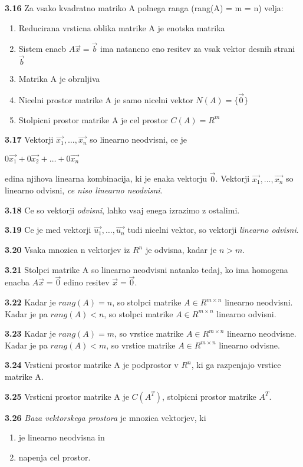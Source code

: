 \documentclass{article}
\begin{document}
\begin{multicols}{4}
\textbf{3.16} Za vsako kvadratno matriko A polnega ranga (rang(A) = m = n) velja:
\begin{enumerate}
    \item Reducirana vrsticna oblika matrike A je enotska matrika
    \item Sistem enacb $A\vec{x} = \vec{b}$ ima natancno eno resitev za vsak vektor desnih strani $\vec{b}$
    \item Matrika A je obrnljiva
    \item Nicelni prostor matrike A je samo nicelni vektor $N(A) = \{\vec{0}\}$
    \item Stolpicni prostor matrike A je cel prostor $C(A) = R^{m}$
\end{enumerate}

\textbf{3.17} Vektorji $\vec{x_{1}}, \dots,\vec{x_{n}}$ so linearno neodvisni, ce je
\begin{center}
    $ 0\vec{x_{1}} + 0\vec{x_{2}} + \dots + 0\vec{x_{n}}$
\end{center}
edina njihova linearna kombinacija, ki je enaka vektorju $\vec{0}$. Vektorji $\vec{x_{1}}, \dots,\vec{x_{n}}$ so
linearno odvisni, \textit{ce niso linearno neodvisni}.

\textbf{3.18} Ce so vektorji \textit{odvisni}, lahko vsaj enega izrazimo z ostalimi.

\textbf{3.19} Ce je med vektorji  $\vec{u_{1}}, \dots,\vec{u_{n}}$ tudi nicelni vektor, so 
vektorji \textit{linearno odvisni}.

\textbf{3.20} Vsaka mnozica n vektorjev iz $R^{n}$ je odvisna, kadar je $n > m $.

\textbf{3.21} Stolpci matrike A so linearno neodvisni natanko tedaj, ko ima homogena enacba
$A\vec{x} = \vec{0}$ edino resitev $\vec{x} = \vec{0}$.

\textbf{3.22} Kadar je $rang(A) = n$, so stolpci matrike $A \in R^{m \times n}$ linearno
neodvisni. Kadar je pa $rang(A) < n$, so stolpci matrike $A \in R^{m \times n}$ linearno odvisni.

\textbf{3.23} Kadar je $rang(A) = m$, so vrstice matrike $A \in R^{m \times n}$ linearno neodvisne.
Kadar je pa $rang(A) < m$, so vrstice matrike $A \in R^{m \times n}$ linearno odvisne.

\textbf{3.24} Vrsticni prostor matrike A je podprostor v $R^{n}$, ki ga razpenjajo vrstice matrike A.

\textbf{3.25} Vrsticni prostor matrike A je $C(A^{T})$, stolpicni prostor matrike $A^{T}$.

\textbf{3.26} \textit{Baza vektorskega prostora} je mnozica vektorjev, ki
\begin{enumerate}
    \item je linearno neodvisna in
    \item napenja cel prostor.
\end{enumerate}


\end{multicols}
\end{document}
